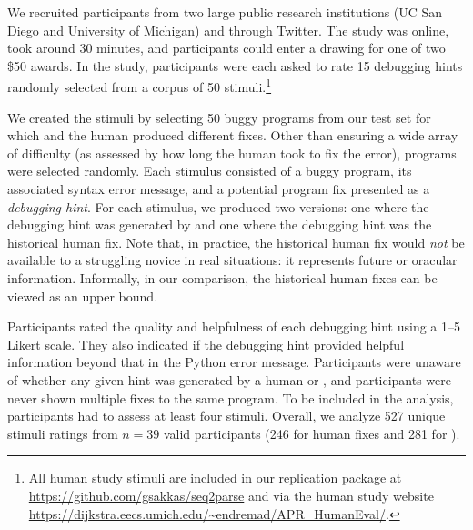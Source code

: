 We recruited participants from two large public
research institutions (UC San Diego and University of Michigan) and through
Twitter. The study was online, took around 30 minutes, and participants could
enter a drawing for one of two \$50 awards. In the study, participants were each
asked to rate 15 debugging hints randomly selected from a corpus of 50
stimuli.\footnote{All human study stimuli are included in our replication
package at \url{https://github.com/gsakkas/seq2parse} and via the human study
website \url{https://dijkstra.eecs.umich.edu/~endremad/APR_HumanEval/}.}

We created the stimuli by selecting 50 buggy programs from our test set for
which \toolname and the human produced different fixes. Other than ensuring a
wide array of difficulty (as assessed by how long the human took to fix the
error), programs were selected randomly. Each stimulus consisted of a buggy
program, its associated syntax error message, and a potential program fix
presented as a \emph{debugging hint}. For each stimulus, we produced two
versions: one where the debugging hint was generated by \toolname and one where
the debugging hint was the historical human fix. Note that, in practice, the
historical human fix would \emph{not} be available to a struggling novice
in real situations: it represents future or oracular information. Informally, in
our comparison, the historical human fixes can be viewed as an upper bound.

Participants rated the quality and
helpfulness of each debugging hint using a 1--5 Likert scale. They also indicated
if the debugging hint provided helpful information beyond that in the Python
error message.
Participants were unaware of whether any given hint was generated by a human or
\toolname, and participants were never shown multiple
fixes to the same program. To be included in the analysis, participants
had to assess at least four stimuli. Overall, we analyze 527 unique stimuli
ratings from $n=39$ valid participants (246 for human fixes and 281 for
\toolname).

